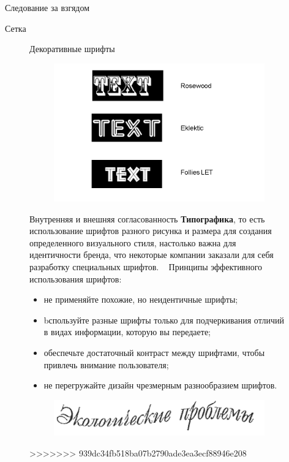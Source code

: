 \documentclass{beamer}
\begin{document}
\begin{frame}[t]{Следование за взгядом}
\begin{frame}[t]{Сетка}
\begin{figure}[h]
\begin{frame}[t]{Декоративные шрифты}
	\begin{figure}[h]
		\centering
		\includegraphics[scale=0.5]{images/lec05-pic10.png}
	\end{figure}
\end{frame}  

\begin{frame}[t]{Внутренняя и внешняя согласованность}
	\textbf{Типографика}, то есть использование шрифтов разного рисунка и размера для создания определенного визуального стиля, настолько важна для идентичности бренда, что некоторые компании заказали для себя разработку специальных шрифтов. 
	~
	Принципы эффективного использования шрифтов: 
	\begin{itemize}
		\item не применяйте похожие, но неидентичные шрифты; 
		\item bспользуйте разные шрифты только для подчеркивания отличий в видах информации, которую вы передаете;
		\item обеспечьте достаточный контраст между шрифтами, чтобы привлечь внимание пользователя;
		\item не перегружайте дизайн чрезмерным разнообразием шрифтов.
	\end{itemize}
	\begin{figure}[h]
		\centering
		\includegraphics[scale=0.5]{images/lec05-pic11.png}
	\end{figure}	
>>>>>>> 939dc34fb518ba07b2790ade3ea3ecf88946e208
\end{frame}


\end{figure}
\end{frame}
\end{frame}
\end{document}
